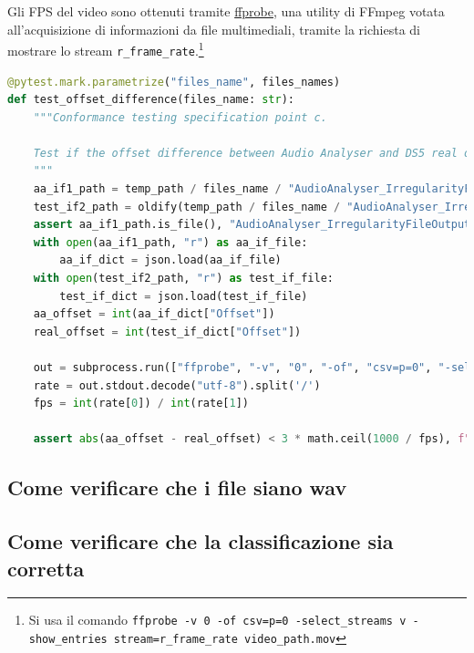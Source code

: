Gli FPS del video sono ottenuti tramite \href{https://ffmpeg.org/ffprobe.html}{ffprobe}, una utility di FFmpeg votata all'acquisizione di informazioni da file multimediali, tramite la richiesta di mostrare lo stream \verb|r_frame_rate|.\footnote{Si usa il comando \verb|ffprobe -v 0 -of csv=p=0 -select_streams v -show_entries stream=r_frame_rate video_path.mov|}
\begin{lstlisting}[language=Python]
@pytest.mark.parametrize("files_name", files_names)
def test_offset_difference(files_name: str):
    """Conformance testing specification point c.

    Test if the offset difference between Audio Analyser and DS5 real offset is small.
    """
    aa_if1_path = temp_path / files_name / "AudioAnalyser_IrregularityFileOutput1.json"
    test_if2_path = oldify(temp_path / files_name / "AudioAnalyser_IrregularityFileOutput1.json")
    assert aa_if1_path.is_file(), "AudioAnalyser_IrregularityFileOutput1.json not found"
    with open(aa_if1_path, "r") as aa_if_file:
        aa_if_dict = json.load(aa_if_file)
    with open(test_if2_path, "r") as test_if_file:
        test_if_dict = json.load(test_if_file)
    aa_offset = int(aa_if_dict["Offset"])
    real_offset = int(test_if_dict["Offset"])

    out = subprocess.run(["ffprobe", "-v", "0", "-of", "csv=p=0", "-select_streams", "v", "-show_entries", "stream=r_frame_rate", str(working_path / "PreservationAudioVisualFile" / (files_name+".mov"))], capture_output=True)
    rate = out.stdout.decode("utf-8").split('/')
    fps = int(rate[0]) / int(rate[1])
    
    assert abs(aa_offset - real_offset) < 3 * math.ceil(1000 / fps), f"Offset difference is too big: {abs(aa_offset - real_offset)}ms"
\end{lstlisting}


\subsection{Come verificare che i file siano wav} \label{ssec:audioanalyser-wav}    %








\subsection{Come verificare che la classificazione sia corretta} \label{ssec:audio-analyser-classificazione}    %
